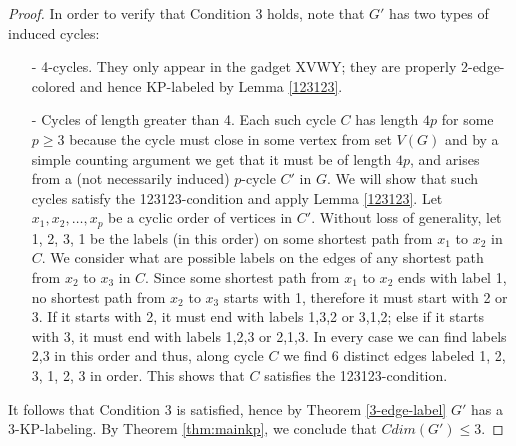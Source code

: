 \documentclass[12pt,a4paper,titlepage,openany]{report}
\begin{document}
\begin{proof}
In order to verify that Condition 3 holds, note that $G'$ has two types of induced cycles:
\begin{enumerate}
\item[-] 4-cycles. They only appear in the gadget XVWY; they are properly 2-edge-colored and hence KP-labeled by Lemma \ref{123123}.
\item[-] Cycles of length greater than 4. Each such cycle $C$ has length $4p$ for some $p \geq 3$ because the cycle must close in some vertex from set $V(G)$ and by a simple counting argument we get that it must be of length $4p$, and arises from a (not necessarily induced) $p$-cycle $C'$ in $G$. We will show that such cycles satisfy the 123123-condition and apply Lemma \ref{123123}. Let $x_1, x_2,\ldots, x_p$ be a cyclic order of vertices in $C'$. Without loss of generality, let 1, 2, 3, 1 be the labels (in this order) on some shortest path from $x_1$ to $x_2$ in $C$. We consider what are possible labels on the edges of any shortest path from $x_2$ to $x_3$ in $C$. Since some shortest path from $x_1$ to $x_2$ ends with label 1, no shortest path from $x_2$ to $x_3$ starts with 1, therefore it must start with 2 or 3. If it starts with 2, it must end with labels 1,3,2 or 3,1,2; else if it starts with 3, it must end with labels 1,2,3 or 2,1,3. In every case we can find labels 2,3 in this order and thus, along cycle $C$ we find 6 distinct edges labeled 1, 2, 3, 1, 2, 3 in order. This shows that $C$ satisfies the 123123-condition.
\end{enumerate}
It follows that Condition 3 is satisfied, hence by Theorem \ref{3-edge-label} $G'$ has a 3-KP-labeling. By Theorem \ref{thm:mainkp}, we conclude that $Cdim(G') \leq 3$.  
\end{proof}
\end{document}
